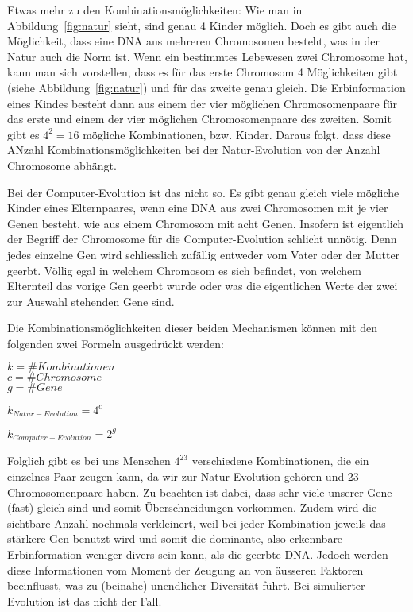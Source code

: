 \documentclass[11pt,a4paper,ngerman]{article}
\begin{document}
Etwas mehr zu den Kombinationsmöglichkeiten: Wie man in Abbildung~\ref{fig:natur} sieht, sind genau 4 Kinder möglich. Doch es gibt auch die Möglichkeit, dass eine DNA aus mehreren Chromosomen besteht, was in der Natur auch die Norm ist. Wenn ein bestimmtes Lebewesen zwei Chromosome hat, kann man sich vorstellen, dass es für das erste Chromosom 4 Möglichkeiten gibt (siehe Abbildung~\ref{fig:natur}) und für das zweite genau gleich. Die Erbinformation eines Kindes besteht dann aus einem der vier möglichen Chromosomenpaare für das erste und einem der vier möglichen Chromosomenpaare des zweiten. Somit gibt es $4^2=16$ mögliche Kombinationen, bzw. Kinder. Daraus folgt, dass diese ANzahl Kombinationsmöglichkeiten bei der Natur-Evolution von der Anzahl Chromosome abhängt.

\bigskip
Bei der Computer-Evolution ist das nicht so. Es gibt genau gleich viele mögliche Kinder eines Elternpaares, wenn eine DNA aus zwei Chromosomen mit je vier Genen besteht, wie aus einem Chromosom mit acht Genen. Insofern ist eigentlich der Begriff der Chromosome für die Computer-Evolution schlicht unnötig. Denn jedes einzelne Gen wird schliesslich zufällig entweder vom Vater oder der Mutter geerbt. Völlig egal in welchem Chromosom es sich befindet, von welchem Elternteil das vorige Gen geerbt wurde oder was die eigentlichen Werte der zwei zur Auswahl stehenden Gene sind.

\bigskip
Die Kombinationsmöglichkeiten dieser beiden Mechanismen können mit den folgenden zwei Formeln ausgedrückt werden:

\bigskip
$k=\#Kombinationen$\\
$c=\#Chromosome$\\
$g=\#Gene$

\bigskip
\large
$k_{Natur-Evolution}=4^c$

\bigskip
$k_{Computer-Evolution}=2^g$

\bigskip
\normalsize
Folglich gibt es bei uns Menschen $4^{23}$ verschiedene Kombinationen, die ein einzelnes Paar zeugen kann, da wir zur Natur-Evolution gehören und 23 Chromosomenpaare haben. Zu beachten ist dabei, dass sehr viele unserer Gene (fast) gleich sind und somit Überschneidungen vorkommen. Zudem wird die sichtbare Anzahl nochmals verkleinert, weil bei jeder Kombination jeweils das stärkere Gen benutzt wird und somit die dominante, also erkennbare Erbinformation weniger divers sein kann, als die geerbte DNA. Jedoch werden diese Informationen vom Moment der Zeugung an von äusseren Faktoren beeinflusst, was zu (beinahe) unendlicher Diversität führt. Bei simulierter Evolution ist das nicht der Fall.
\end{document}
